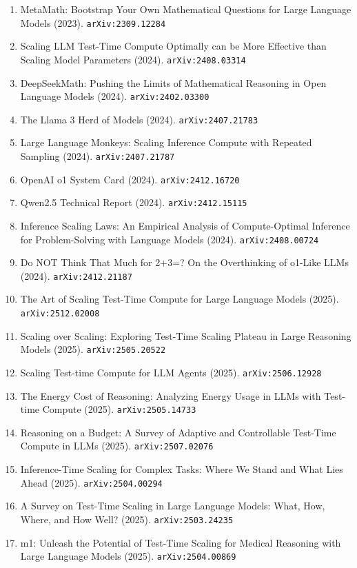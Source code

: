 \documentclass[11pt]{article}
\begin{document}
\begin{enumerate}
  Model (2023). \texttt{arXiv:2305.18290}
  \item MetaMath: Bootstrap Your Own Mathematical Questions for Large Language
  Models (2023). \texttt{arXiv:2309.12284}
  \item Scaling LLM Test-Time Compute Optimally can be More Effective than
  Scaling Model Parameters (2024). \texttt{arXiv:2408.03314}
  \item DeepSeekMath: Pushing the Limits of Mathematical Reasoning in Open
  Language Models (2024). \texttt{arXiv:2402.03300}
  \item The Llama 3 Herd of Models (2024). \texttt{arXiv:2407.21783}
  \item Large Language Monkeys: Scaling Inference Compute with Repeated Sampling (2024). \texttt{arXiv:2407.21787}
  \item OpenAI o1 System Card (2024). \texttt{arXiv:2412.16720}
  \item Qwen2.5 Technical Report (2024). \texttt{arXiv:2412.15115}
  \item Inference Scaling Laws: An Empirical Analysis of Compute-Optimal
  Inference for Problem-Solving with Language Models (2024). \texttt{arXiv:2408.00724}
  \item Do NOT Think That Much for 2+3=? On the Overthinking of o1-Like LLMs (2024). \texttt{arXiv:2412.21187}
  \item The Art of Scaling Test-Time Compute for Large Language Models (2025). \texttt{arXiv:2512.02008}
  \item Scaling over Scaling: Exploring Test-Time Scaling Plateau in Large Reasoning Models (2025). \texttt{arXiv:2505.20522}
  \item Scaling Test-time Compute for LLM Agents (2025). \texttt{arXiv:2506.12928}
  \item The Energy Cost of Reasoning: Analyzing Energy Usage in LLMs with Test-time Compute (2025). \texttt{arXiv:2505.14733}
  \item Reasoning on a Budget: A Survey of Adaptive and Controllable Test-Time Compute in LLMs (2025). \texttt{arXiv:2507.02076}
  \item Inference-Time Scaling for Complex Tasks: Where We Stand and What Lies
  Ahead (2025). \texttt{arXiv:2504.00294}
  \item A Survey on Test-Time Scaling in Large Language Models: What, How,
  Where, and How Well? (2025). \texttt{arXiv:2503.24235}
  \item m1: Unleash the Potential of Test-Time Scaling for Medical Reasoning with Large Language Models (2025). \texttt{arXiv:2504.00869}

\end{enumerate}
\end{document}
